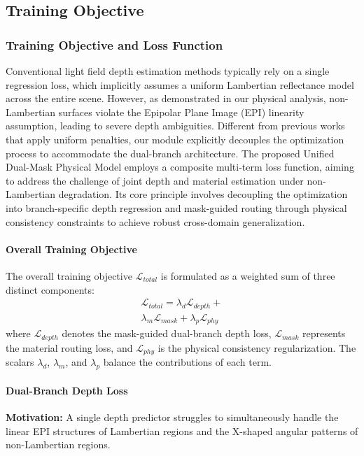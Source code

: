 \documentclass[lettersize,journal]{IEEEtran}
\begin{document}
\subsection{Training Objective}

\subsubsection{Training Objective and Loss Function}

Conventional light field depth estimation methods typically rely on a single regression loss, which implicitly assumes a uniform Lambertian reflectance model across the entire scene. However, as demonstrated in our physical analysis, non-Lambertian surfaces violate the Epipolar Plane Image (EPI) linearity assumption, leading to severe depth ambiguities. Different from previous works that apply uniform penalties, our module explicitly decouples the optimization process to accommodate the dual-branch architecture. The proposed Unified Dual-Mask Physical Model employs a composite multi-term loss function, aiming to address the challenge of joint depth and material estimation under non-Lambertian degradation. Its core principle involves decoupling the optimization into branch-specific depth regression and mask-guided routing through physical consistency constraints to achieve robust cross-domain generalization.

\paragraph{Overall Training Objective}
The overall training objective $\mathcal{L}_{total}$ is formulated as a weighted sum of three distinct components:
\begin{multline}
\mathcal{L}_{total} = \lambda_{d} \mathcal{L}_{depth} +  \\
\lambda_{m} \mathcal{L}_{mask} + \lambda_{p} \mathcal{L}_{phy}
\label{eq:ch3_23}
\end{multline}
where $\mathcal{L}_{depth}$ denotes the mask-guided dual-branch depth loss, $\mathcal{L}_{mask}$ represents the material routing loss, and $\mathcal{L}_{phy}$ is the physical consistency regularization. The scalars $\lambda_{d}$, $\lambda_{m}$, and $\lambda_{p}$ balance the contributions of each term.

\paragraph{Dual-Branch Depth Loss}
\textbf{Motivation:} A single depth predictor struggles to simultaneously handle the linear EPI structures of Lambertian regions and the X-shaped angular patterns of non-Lambertian regions. 
\end{document}
